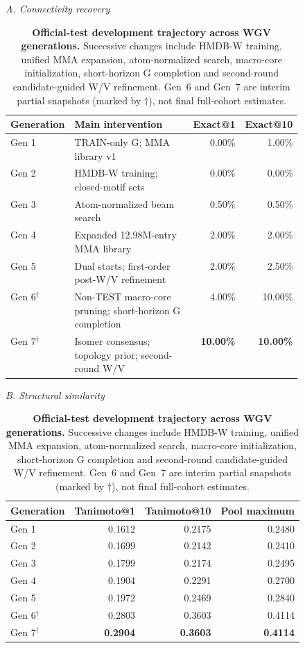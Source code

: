 \begin{table}[!htbp]
\centering
\caption{\textbf{Official-test development trajectory across WGV generations.}
Successive changes include HMDB-W training, unified MMA expansion, atom-normalized
search, macro-core initialization, short-horizon G completion and second-round
candidate-guided W/V refinement. Gen~6 and Gen~7 are interim partial snapshots
(marked by $\dagger$), not final full-cohort estimates.}
\label{tab:rsi_gen_ledger}
\small
\setlength{\tabcolsep}{3.5pt}
\renewcommand{\arraystretch}{1.10}
\noindent\textit{A. Connectivity recovery}\par\vspace{3pt}
\begin{tabular}{@{}lp{0.49\linewidth}rr@{}}
\toprule
Generation & Main intervention & Exact@1 & Exact@10 \\
\midrule
Gen 1 & TRAIN-only G; MMA library v1 & 0.00\% & 1.00\% \\
Gen 2 & HMDB-W training; closed-motif sets & 0.00\% & 0.00\% \\
Gen 3 & Atom-normalized beam search & 0.50\% & 0.50\% \\
Gen 4 & Expanded 12.98M-entry MMA library & 2.00\% & 2.00\% \\
Gen 5 & Dual starts; first-order post-W/V refinement & 2.00\% & 2.50\% \\
Gen 6$^\dagger$ & Non-TEST macro-core pruning; short-horizon G completion & 4.00\% & 10.00\% \\
Gen 7$^\dagger$ & Isomer consensus; topology prior; second-round W/V & \textbf{10.00\%} & \textbf{10.00\%} \\
\bottomrule
\end{tabular}
\par\vspace{8pt}
\noindent\textit{B. Structural similarity}\par\vspace{3pt}
\begin{tabular}{@{}lrrr@{}}
\toprule
Generation & Tanimoto@1 & Tanimoto@10 & Pool maximum \\
\midrule
Gen 1 & 0.1612 & 0.2175 & 0.2480 \\
Gen 2 & 0.1699 & 0.2142 & 0.2410 \\
Gen 3 & 0.1799 & 0.2174 & 0.2495 \\
Gen 4 & 0.1904 & 0.2291 & 0.2700 \\
Gen 5 & 0.1972 & 0.2469 & 0.2840 \\
Gen 6$^\dagger$ & 0.2803 & 0.3603 & 0.4114 \\
Gen 7$^\dagger$ & \textbf{0.2904} & \textbf{0.3603} & \textbf{0.4114} \\
\bottomrule
\end{tabular}
\end{table}

